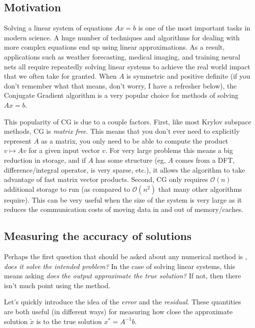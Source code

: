 \hypertarget{motivation}{%
\subsection{Motivation}\label{motivation}}

Solving a linear system of equations \(Ax=b\) is one of the most
important tasks in modern science. A huge number of techniques and
algorithms for dealing with more complex equations end up using linear
approximations. As a result, applications such as weather forecasting,
medical imaging, and training neural nets all require repeatedly solving
linear systems to achieve the real world impact that we often take for
granted. When \(A\) is symmetric and positive definite (if you don't
remember what that means, don't worry, I have a refresher below), the
Conjugate Gradient algorithm is a very popular choice for methods of
solving \(Ax=b\).

This popularity of CG is due to a couple factors. First, like most
Krylov subspace methods, CG is \emph{matrix free}. This means that you
don't ever need to explicitly represent \(A\) as a matrix, you only need
to be able to compute the product \(v\mapsto Av\) for a given input
vector \(v\). For very large problems this means a big reduction in
storage, and if \(A\) has some structure (eg, \(A\) comes from a DFT,
difference/integral operator, is very sparse, etc.), it allows the
algorithm to take advantage of fast matrix vector products. Second, CG
only requires \(\mathcal{O}(n)\) additional storage to run (as compared
to \(\mathcal{O}(n^2)\) that many other algorithms require). This can be
very useful when the size of the system is very large as it reduces the
communication costs of moving data in and out of memory/caches.

\hypertarget{measuring-the-accuracy-of-solutions}{%
\subsection{Measuring the accuracy of
solutions}\label{measuring-the-accuracy-of-solutions}}

Perhaps the first question that should be asked about any numerical
method is , \emph{does it solve the intended problem?} In the case of
solving linear systems, this means asking \emph{does the output
approximate the true solution?} If not, then there isn't much point
using the method.

Let's quickly introduce the idea of the \emph{error} and the
\emph{residual}. These quantities are both useful (in different ways)
for measuring how close the approximate solution \(\tilde{x}\) is to the
true solution \(x^* = A^{-1}b\).

